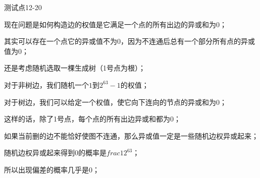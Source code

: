 \documentclass{beamer}
\begin{document}
\begin{frame}{测试点12-20}

	\par 现在问题是如何构造边的权值是它满足一个点的所有出边的异或和为0；

	\pause

	\par 其实可以存在一个点它的异或值不为0，因为不连通后总有一个部分所有点的异或值为0；

	\pause

	\par 还是考虑随机选取一棵生成树（1号点为根）；

	\par 对于非树边，我们随机一个$1$到$2^{63}-1$的权值；

	\par 对于树边，我们可以给定一个权值，使它向下连向的节点的异或和为0；

	\pause

	\par 这样的话，除了1号点，每个点的所有出边异或和都为0；

	\pause

	\par 如果当前删的边不能恰好使图不连通，那么异或值一定是一些随机边权异或起来；

	\par 随机边权异或起来得到0的概率是$frac{1}{2^{63}}$；

	\par 所以出现偏差的概率几乎是0；

\end{frame}
\end{document}
